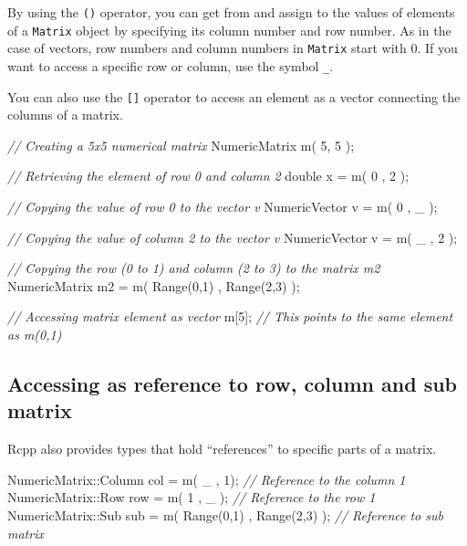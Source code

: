 \documentclass[]{book}
\newenvironment{Shaded}{\begin{snugshade}}{\end{snugshade}}
\newcommand{\CommentTok}[1]{\textcolor[rgb]{0.56,0.35,0.01}{\textit{#1}}}
\newcommand{\DataTypeTok}[1]{\textcolor[rgb]{0.13,0.29,0.53}{#1}}
\newcommand{\DecValTok}[1]{\textcolor[rgb]{0.00,0.00,0.81}{#1}}
\newcommand{\NormalTok}[1]{#1}
\begin{document}
By using the \texttt{()} operator, you can get from and assign to the values of elements of a \texttt{Matrix} object by specifying its column number and row number. As in the case of vectors, row numbers and column numbers in \texttt{Matrix} start with 0. If you want to access a specific row or column, use the symbol \texttt{\_}.

You can also use the \texttt{{[}{]}} operator to access an element as a vector connecting the columns of a matrix.

\begin{Shaded}
\begin{Highlighting}[]
\CommentTok{// Creating a 5x5 numerical matrix}
\NormalTok{NumericMatrix m( }\DecValTok{5}\NormalTok{, }\DecValTok{5}\NormalTok{ );}

\CommentTok{// Retrieving the element of row 0 and column 2}
\DataTypeTok{double}\NormalTok{ x = m( }\DecValTok{0}\NormalTok{ , }\DecValTok{2}\NormalTok{ );}

\CommentTok{// Copying the value of row 0 to the vector v}
\NormalTok{NumericVector v = m( }\DecValTok{0}\NormalTok{ , _ );}

\CommentTok{// Copying the value of column 2 to the vector v}
\NormalTok{NumericVector v = m( _ , }\DecValTok{2}\NormalTok{ );}

\CommentTok{// Copying the row (0 to 1) and column (2 to 3) to the matrix m2}
\NormalTok{NumericMatrix m2 = m( Range(}\DecValTok{0}\NormalTok{,}\DecValTok{1}\NormalTok{) , Range(}\DecValTok{2}\NormalTok{,}\DecValTok{3}\NormalTok{) );}

\CommentTok{// Accessing matrix element as vector}
\NormalTok{m[}\DecValTok{5}\NormalTok{]; }\CommentTok{// This points to the same element as m(0,1)}
\end{Highlighting}
\end{Shaded}

\hypertarget{accessing-as-reference-to-row-column-and-sub-matrix}{%
\subsection{Accessing as reference to row, column and sub matrix}\label{accessing-as-reference-to-row-column-and-sub-matrix}}

Rcpp also provides types that hold ``references'' to specific parts of a matrix.

\begin{Shaded}
\begin{Highlighting}[]
\NormalTok{NumericMatrix::Column col = m( _ , }\DecValTok{1}\NormalTok{);  }\CommentTok{// Reference to the column 1}
\NormalTok{NumericMatrix::Row    row = m( }\DecValTok{1}\NormalTok{ , _ ); }\CommentTok{// Reference to the row 1}
\NormalTok{NumericMatrix::Sub    sub = m( Range(}\DecValTok{0}\NormalTok{,}\DecValTok{1}\NormalTok{) , Range(}\DecValTok{2}\NormalTok{,}\DecValTok{3}\NormalTok{) ); }\CommentTok{// Reference to sub matrix}
\end{Highlighting}
\end{Shaded}
\end{document}
